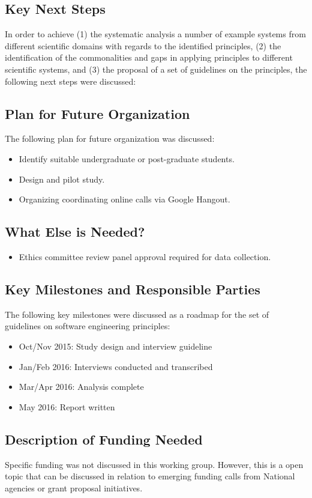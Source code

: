 \subsection{Key Next Steps}
In order to achieve (1) the systematic analysis a number of example systems from
different scientific domains with regards to the identified principles, (2) the
identification of the commonalities and gaps in applying principles to different
scientific systems, and (3) the proposal of a set of guidelines on the
principles, the following next steps were discussed:

\subsection{Plan for Future Organization}
The following plan for future organization was discussed:
\begin{itemize}
\item Identify suitable undergraduate or post-graduate students.
\item Design and pilot study.
\item Organizing coordinating online calls via Google Hangout.
\end{itemize}

\subsection{What Else is Needed?}
\begin{itemize}
\item Ethics committee review panel approval required for data collection.
\end{itemize}

\subsection{Key Milestones and Responsible Parties}
The following key milestones were discussed as a roadmap for the set of
guidelines on software engineering principles:
\begin{itemize}
\item Oct/Nov 2015: Study design and interview guideline
\item Jan/Feb 2016: Interviews conducted and transcribed
\item Mar/Apr 2016: Analysis complete
\item May 2016: Report written
\end{itemize}

\subsection{Description of Funding Needed}
Specific funding was not discussed in this working group. However, this is a
open topic that can be discussed in relation to emerging funding calls from
National agencies or grant proposal initiatives.
